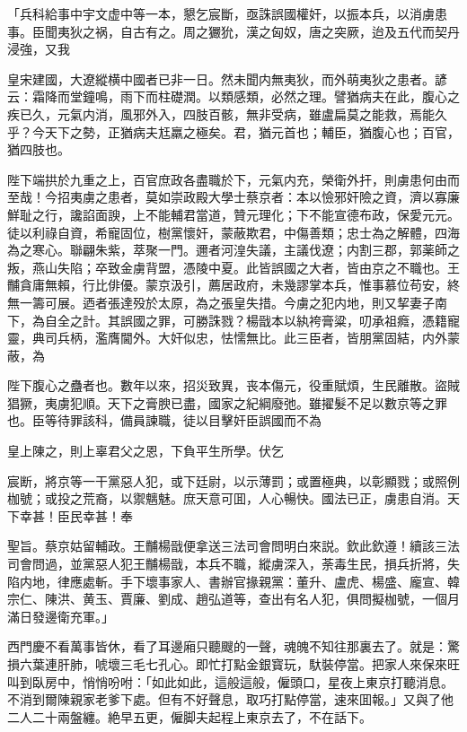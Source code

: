 \begin{myquote}
「兵科給事中宇文虚中等一本，懇乞宸斷，亟誅誤國權奸，以振本兵，以消虜患事。臣聞夷狄之祸，自古有之。周之玁狁，漢之匈奴，唐之突厥，迨及五代而契丹浸強，又我

皇宋建國，大遼縱横中國者已非一日。然未聞内無夷狄，而外萌夷狄之患者。諺云：霜降而堂鐘鳴，雨下而柱礎潤。以類感類，必然之理。譬猶病夫在此，腹心之疾已久，元氣内消，風邪外入，四肢百骸，無非受病，雖盧扁莫之能救，焉能久乎？今天下之勢，正猶病夫尪羸之極矣。君，猶元首也；輔臣，猶腹心也；百官，猶四肢也。

陛下端拱於九重之上，百官庶政各盡職於下，元氣内充，榮衛外扞，則虜患何由而至哉！今招夷虜之患者，莫如崇政殿大學士蔡京者：本以憸邪奸險之資，濟以寡廉鮮耻之行，讒諂面諛，上不能輔君當道，贊元理化；下不能宣德布政，保愛元元。徒以利祿自資，希寵固位，樹黨懷奸，蒙蔽欺君，中傷善類；忠士為之解體，四海為之寒心。聯翩朱紫，萃聚一門。邇者河湟失議，主議伐遼；内割三郡，郭薬師之叛，燕山失陷；卒致金虜背盟，憑陵中夏。此皆誤國之大者，皆由京之不職也。王黼貪庸無賴，行比俳優。蒙京汲引，薦居政府，未幾謬掌本兵，惟事慕位苟安，終無一籌可展。迺者張達殁於太原，為之張皇失措。今虜之犯内地，則又挈妻子南下，為自全之計。其誤國之罪，可勝誅戮？楊戩本以紈袴膏粱，叨承祖癊，憑籍寵靈，典司兵柄，濫膺閫外。大奸似忠，怯懦無比。此三臣者，皆朋黨固結，内外蒙蔽，為

陛下腹心之蠱者也。數年以來，招災致異，丧本傷元，役重賦煩，生民離散。盜賊猖獗，夷虜犯順。天下之膏腴已盡，國家之紀綱廢弛。雖擢髮不足以數京等之罪也。臣等待罪該科，備員諫職，徒以目擊奸臣誤國而不為

皇上陳之，則上辜君父之恩，下負平生所學。伏乞

宸断，將京等一干黨惡人犯，或下廷尉，以示薄罰；或置極典，以彰顯戮；或照例枷號；或投之荒裔，以禦魑魅。庶天意可囬，人心暢快。國法已正，虜患自消。天下幸甚！臣民幸甚！奉

聖旨。蔡京姑留輔政。王黼楊戩便拿送三法司會問明白來説。欽此欽遵！續該三法司會問過，並黨惡人犯王黼楊戩，本兵不職，縱虜深入，荼毒生民，損兵折將，失陷内地，律應處斬。手下壞事家人、書辦官掾親黨：董升、盧虎、楊盛、龐宣、韓宗仁、陳洪、黄玉、賈廉、劉成、趙弘道等，查出有名人犯，俱問擬枷號，一個月滿日發邊衛充軍。」
\end{myquote}

西門慶不看萬事皆休，看了耳邊廂只聽颼的一聲，魂魄不知往那裏去了。就是：驚損六葉連肝肺，唬壞三毛七孔心。即忙打點金銀寳玩，馱裝停當。把家人來保來旺叫到臥房中，悄悄吩咐：「如此如此，這般這般，僱頭口，星夜上東京打聽消息。不消到爾陳親家老爹下處。但有不好聲息，取巧打點停當，速來囬報。」又與了他二人二十兩盤纏。絶早五更，僱脚夫起程上東京去了，不在話下。

